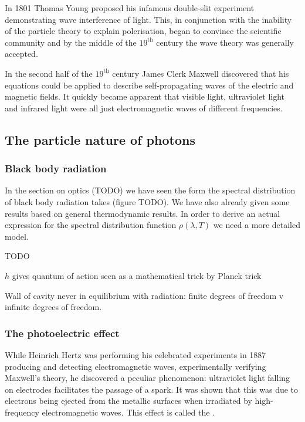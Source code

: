 In 1801 Thomas Young proposed his infamous double-slit experiment demonstrating wave interference of light. This, in conjunction with the inability of the particle theory to explain polerisation, began to convince the scientific community and by the middle of the $19^\text{th}$ century the wave theory was generally accepted.

In the second half of the $19^\text{th}$ century James Clerk Maxwell discovered that his equations could be applied to describe self-propagating waves of the electric and magnetic fields. It quickly became apparent that visible light, ultraviolet light and infrared light were all just electromagnetic waves of different frequencies.

\subsection{The particle nature of photons}
\subsubsection{Black body radiation}
In the section on optics (TODO) we have seen the form the spectral distribution of black body radiation takes (figure TODO). We have also already given some results based on general thermodynamic results. In order to derive an actual expression for the spectral distribution function $\rho(\lambda, T)$ we need a more detailed model.

TODO

$h$ gives quantum of action
seen as a mathematical trick by Planck trick

Wall of cavity never in equilibrium with radiation: finite degrees of freedom v infinite degrees of freedom.

\subsubsection{The photoelectric effect}
While Heinrich Hertz was performing his celebrated experiments in 1887 producing and detecting electromagnetic waves, experimentally verifying Maxwell's theory, he discovered a peculiar phenomenon: ultraviolet light falling on electrodes facilitates the passage of a spark. It was shown that this was due to electrons being ejected from the metallic surfaces when irradiated by high-frequency electromagnetic waves. This effect is called the .

